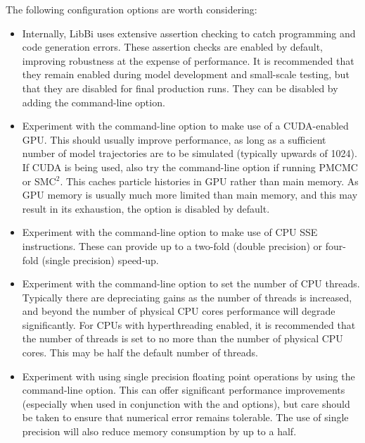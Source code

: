 The following configuration options are worth considering:
\begin{itemize}
\item Internally, LibBi uses extensive assertion checking to catch programming
  and code generation errors. These assertion
  checks are enabled by default, improving robustness at the expense of
  performance. It is recommended that they remain enabled during model
  development and small-scale testing, but that they are disabled for final
  production runs. They can be disabled by adding the 
  command-line option.

\item Experiment with the  command-line option to make use
  of a CUDA-enabled GPU. This should usually improve
  performance, as long as a sufficient number of model trajectories are to be
  simulated (typically upwards of 1024). If CUDA is being used, also try the
   command-line option if running PMCMC or SMC$^2$.
  This caches particle histories in GPU rather than main memory. As GPU
  memory is usually much more limited than main memory, and this may result in
  its exhaustion, the option is disabled by default.

\item Experiment with the  command-line
  option to make use of CPU SSE instructions. These can
  provide up to a two-fold (double precision) or four-fold (single precision)
  speed-up.

\item {} Experiment with the
   command-line option to set the number of CPU
  threads. Typically there are depreciating gains as the number of threads is
  increased, and beyond the number of physical CPU cores performance will
  degrade significantly. For CPUs with hyperthreading enabled, it is
  recommended that the number of threads is set to no more than the number of
  physical CPU cores. This may be half the default number of threads.

\item Experiment with using single precision floating
  point operations by using the  command-line
  option. This can offer significant performance improvements (especially when
  used in conjunction with the  and 
  options), but care should be taken to ensure that numerical error remains
  tolerable. The use of single precision will also reduce memory consumption
  by up to a half.


\end{itemize}

